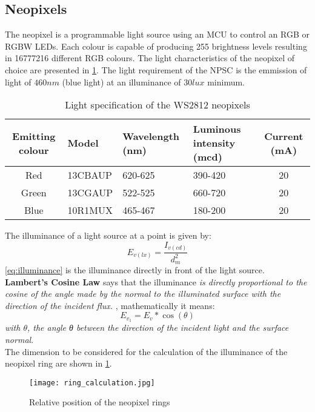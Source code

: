 \subsection{Neopixels}\label{neopixels}
The neopixel is a programmable light source using an MCU to control an RGB or RGBW LEDs. Each colour is capable of producing 255 brightness levels resulting in 16777216 different RGB colours. 
The light characteristics of the neopixel of choice are presented in \cref{table:neopixel_specs}. The light requirement of the NPSC is the emmission of light of $460nm$ (blue light) at an illuminance of $30lux$ minimum.
\begin{table}[h!]
\centering
\begin{tabular}{cp{6em}p{6em}p{6em}c}
\hline
\hline
\textbf{Emitting colour} & \textbf{Model} & \textbf{Wavelength (nm)} & \textbf{Luminous intensity (mcd)}  & \textbf{Current (mA)}\\ 
\hline
Red & 13CBAUP & 620-625 & 390-420 & 20\\
Green & 13CGAUP & 522-525 & 660-720 & 20\\
Blue & 10R1MUX & 465-467 & 180-200 & 20\\
\hline
\hline
\end{tabular}
\caption{Light specification of the WS2812 neopixels}
\label{table:neopixel_specs}
\end{table}
The illuminance of a light source at a point is given by: 
\begin{equation}\label{eq:illuminance}
E_{v(lx)}=\frac{I_{v(cd)}}{d_m^2}
\end{equation}
\cref{eq:illuminance} is the illuminance directly in front of the light source. \textbf{Lambert's Cosine Law} says that the illuminance \textit{is directly proportional to the cosine of the angle made by the normal to the illuminated surface with the direction of the incident flux.} \cite{optical}, mathematically it means:
\begin{equation}\label{eq:lambert}
E_{v_1}=E_v*\cos(\theta)
\end{equation}
\textit{with $\theta$, the angle θ between the direction of the incident light and the surface normal}.\\
The dimension to be considered for the calculation of the illuminance of the neopixel ring are shown in \cref{fig:neopixel_ring_dimension}.
\begin{figure}[h!]
\centering
\texttt{[image: ring\_calculation.jpg]}
\caption{Relative position of the neopixel rings}
\label{fig:neopixel_ring_dimension}
\end{figure}
